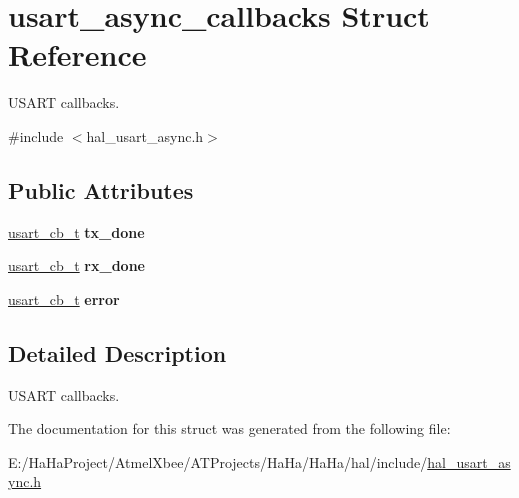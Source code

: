 \hypertarget{structusart__async__callbacks}{}\section{usart\+\_\+async\+\_\+callbacks Struct Reference}
\label{structusart__async__callbacks}


U\+S\+A\+RT callbacks.  




{\ttfamily \#include $<$hal\+\_\+usart\+\_\+async.\+h$>$}

\subsection*{Public Attributes}
\begin{DoxyCompactItemize}
\item 
\mbox{\label{structusart__async__callbacks_a3b40d7b9783136ddf7e9bf49b9598d08}} 
\hyperlink{group__doc__driver__hal__usart__async_ga430e4080a53e1f39c4d46da01200f633}{usart\+\_\+cb\+\_\+t} {\bfseries tx\+\_\+done}
\item 
\mbox{\label{structusart__async__callbacks_a5363ee6cc91c18b9cec22fcfc7270895}} 
\hyperlink{group__doc__driver__hal__usart__async_ga430e4080a53e1f39c4d46da01200f633}{usart\+\_\+cb\+\_\+t} {\bfseries rx\+\_\+done}
\item 
\mbox{\label{structusart__async__callbacks_a04f0dca1ca10974d9458dd11871a5b58}} 
\hyperlink{group__doc__driver__hal__usart__async_ga430e4080a53e1f39c4d46da01200f633}{usart\+\_\+cb\+\_\+t} {\bfseries error}
\end{DoxyCompactItemize}


\subsection{Detailed Description}
U\+S\+A\+RT callbacks. 

The documentation for this struct was generated from the following file\+:\begin{DoxyCompactItemize}
\item 
E\+:/\+Ha\+Ha\+Project/\+Atmel\+Xbee/\+A\+T\+Projects/\+Ha\+Ha/\+Ha\+Ha/hal/include/\hyperlink{hal__usart__async_8h}{hal\+\_\+usart\+\_\+async.\+h}\end{DoxyCompactItemize}
